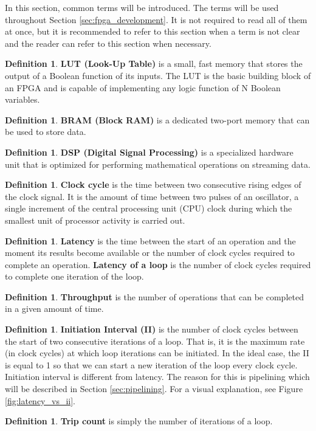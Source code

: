 \documentclass[a4paper, twoside]{report}
\theoremstyle{definition}
\newtheorem{definition}[theorem]{Definition}
\numberwithin{equation}{section}
\begin{document}
In this section, common terms will be introduced.
The terms will be used throughout Section \ref{sec:fpga_development}.
It is not required to read all of them at once, but it is recommended to refer to this section
when a term is not clear and the reader can refer to this section when necessary.

\begin{definition}
    \textbf{LUT (Look-Up Table)} is a small, fast memory that stores the output of a Boolean function of its inputs.
    The LUT is the basic building block of an FPGA and is capable of implementing any logic function of N Boolean variables.
\end{definition}
\begin{definition}
    \textbf{BRAM (Block RAM)} is a dedicated two-port memory that can be used to store data.
\end{definition}
\begin{definition}
    \textbf{DSP (Digital Signal Processing)} is a specialized hardware unit that is optimized for performing mathematical operations on streaming data.
\end{definition}
\begin{definition}
    \textbf{Clock cycle} is the time between two consecutive rising edges of the clock signal.
    It is the amount of time between two pulses of an oscillator, a single increment of the
    central processing unit (CPU) clock during which the smallest unit of processor activity
    is carried out.
\end{definition}
\begin{definition}
    \textbf{Latency} is the time between the start of an operation and the moment its results become available
    or the number of clock cycles required to complete an operation.
    \textbf{Latency of a loop} is the number of clock cycles required to complete one iteration of the loop.
\end{definition}
\begin{definition}
    \textbf{Throughput} is the number of operations that can be completed in a given amount of time.
\end{definition}
\begin{definition}
    \textbf{Initiation Interval (II)} is the number of clock cycles between the start of two consecutive iterations of a loop.
    That is, it is the maximum rate (in clock cycles) at which loop iterations can be initiated.
    In the ideal case, the II is equal to 1 so that we can start a new iteration of the loop every clock cycle.
    Initiation interval is different from latency.
    The reason for this is pipelining which will be described in Section \ref{sec:pipelining}.
    For a visual explanation, see Figure \ref{fig:latency_vs_ii}.
\end{definition}
\begin{definition}
    \textbf{Trip count} is simply the number of iterations of a loop.
\end{definition}
\end{document}
